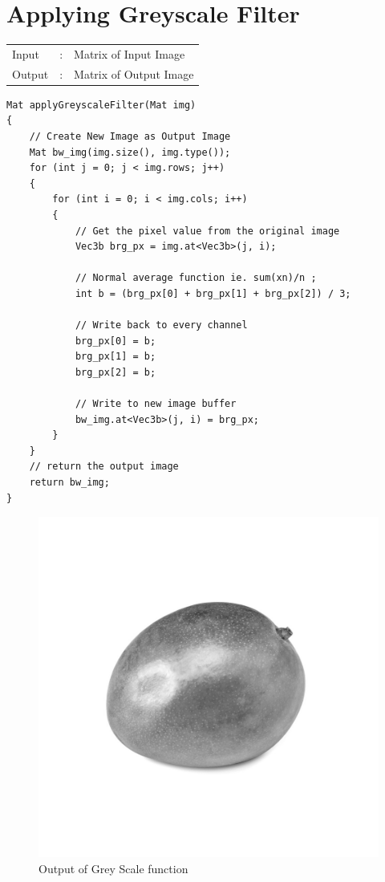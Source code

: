 \documentclass[12pt,a4paper]{report}
\begin{document}
\section{Applying Greyscale Filter}
\begin{tabular}{lll}
    Input  & : & Matrix of Input Image  \\
    Output & : & Matrix of Output Image \\
\end{tabular}
\begin{lstlisting}
Mat applyGreyscaleFilter(Mat img)
{
    // Create New Image as Output Image
    Mat bw_img(img.size(), img.type());
    for (int j = 0; j < img.rows; j++)
    {
        for (int i = 0; i < img.cols; i++)
        {
            // Get the pixel value from the original image
            Vec3b brg_px = img.at<Vec3b>(j, i);

            // Normal average function ie. sum(xn)/n ;
            int b = (brg_px[0] + brg_px[1] + brg_px[2]) / 3;

            // Write back to every channel
            brg_px[0] = b;
            brg_px[1] = b;
            brg_px[2] = b;

            // Write to new image buffer
            bw_img.at<Vec3b>(j, i) = brg_px;
        }
    }
    // return the output image
    return bw_img;
}
\end{lstlisting}
\begin{figure}[!htb]
    \centering
      \includegraphics[height=0.4\paperheight]{output/grey_scale.jpg}
    \caption{Output of Grey Scale function}
\end{figure}
\clearpage
\end{document}
